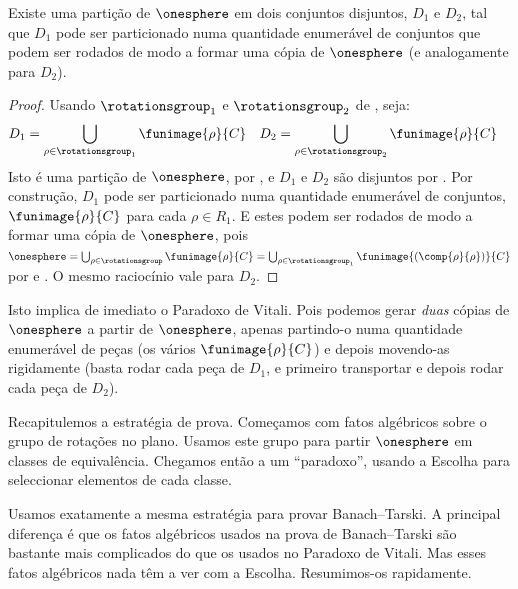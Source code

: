\documentclass[../../../include/open-logic-section]{subfiles}
\begin{document}
\begin{lem}
Existe uma partição de $\onesphere$ em dois conjuntos disjuntos, $D_{1}$
e $D_{2}$, tal que $D_{1}$ pode ser particionado numa quantidade enumerável de
conjuntos que podem ser rodados de modo a formar uma cópia de $\onesphere$ (e
analogamente para $D_{2}$).
\end{lem}

\begin{proof}
Usando $\rotationsgroup_{1}$ e $\rotationsgroup_{2}$ de , seja:
\begin{align*}
	D_{1} &= \bigcup_{\rho \in \rotationsgroup_1} \funimage{\rho}{C} & 
	D_{2} &= \bigcup_{\rho \in \rotationsgroup_2} \funimage{\rho}{C}
\end{align*}
Isto é uma partição de $\onesphere$, por , e $D_1$
e $D_2$ são disjuntos por . Por construção,
$D_1$ pode ser particionado numa quantidade enumerável de conjuntos,
$\funimage{\rho}{C}$ para cada $\rho \in R_1$. E estes podem ser rodados
de modo a formar uma cópia de $\onesphere$, pois $\onesphere = \bigcup_{\rho \in
\rotationsgroup}\funimage{\rho}{C} = \bigcup_{\rho \in
\rotationsgroup_1}\funimage{(\comp{\rho}{\rho})}{C}$ por
 e . O mesmo raciocínio
vale para $D_2$. \end{proof}\noindent Isto implica de imediato
o Paradoxo de Vitali. Pois podemos gerar \emph{duas} cópias de
$\onesphere$ a partir de $\onesphere$, apenas partindo-o numa quantidade enumerável de
peças (os vários $\funimage{\rho}{C}$) e depois movendo-as rigidamente
(basta rodar cada peça de $D_1$, e primeiro transportar
e depois rodar cada peça de $D_2$).

Recapitulemos a estratégia de prova. Começamos com fatos algébricos sobre o grupo de rotações no plano. Usamos este grupo para
partir $\onesphere$ em classes de equivalência. Chegamos então a um
``paradoxo'', usando a Escolha para seleccionar elementos de cada classe.

Usamos exatamente a mesma estratégia para provar Banach--Tarski. A principal
diferença é que os fatos algébricos usados na prova de Banach--Tarski
são bastante mais complicados do que os usados no Paradoxo de Vitali. Mas esses fatos algébricos nada têm a ver com a
Escolha. Resumimos-os rapidamente. 
\end{document}
